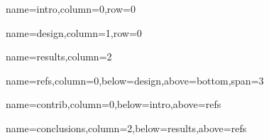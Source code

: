 \documentclass[landscape,archE,fontscale=0.2]{baposter}
\begin{document}
\begin{poster}
  {name=intro,column=0,row=0}{}

  {name=design,column=1,row=0}{}

  {name=results,column=2}{}

  {name=refs,column=0,below=design,above=bottom,span=3}{
    \setlength{\bibitemsep}{0pt}
    \renewcommand*{\bibfont}{\footnotesize}
    \printbibliography[heading=none]
  }

  {name=contrib,column=0,below=intro,above=refs}{}

  {name=conclusions,column=2,below=results,above=refs}{}

\end{poster}
\end{document}
